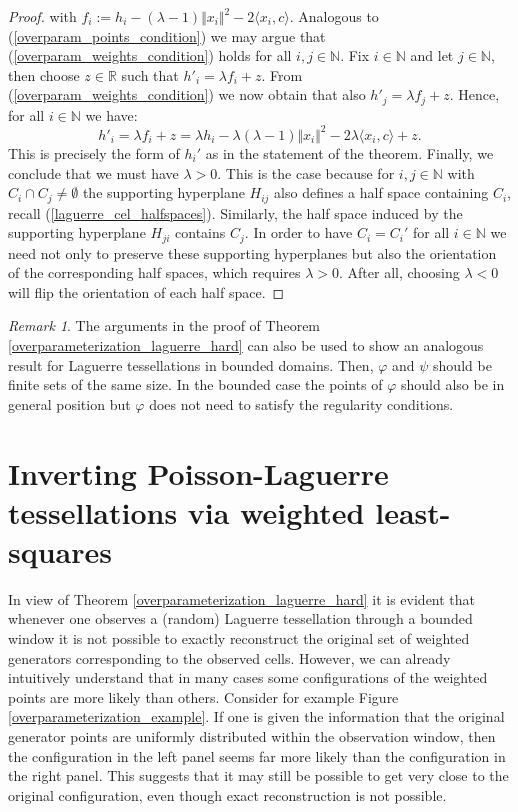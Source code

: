 \documentclass{article}
\newcommand{\NN}{\mathbb{N}}
\newcommand{\RR}{\mathbb{R}}
\theoremstyle{plain}
\theoremstyle{remark}
\newtheorem{remark}{Remark}
\theoremstyle{definition}
\begin{document}
\begin{proof}
    with $f_i := h_i - (\lambda - 1)\Vert x_i \Vert^2 - 2\langle x_i,c\rangle$. Analogous to (\ref{overparam_points_condition}) we may argue that (\ref{overparam_weights_condition}) holds for all $i,j \in \NN$. Fix $i \in \NN$ and let $j \in \NN$, then choose $z \in \RR$ such that $h'_i = \lambda f_i + z$. From (\ref{overparam_weights_condition}) we now obtain that also $h'_j = \lambda f_j + z$. Hence, for all $i \in \NN$ we have:  
    \[h'_i = \lambda f_i + z = \lambda h_i - \lambda(\lambda - 1)\Vert x_i \Vert^2 - 2\lambda\langle x_i,c\rangle + z.\]
    This is precisely the form of $h_i'$ as in the statement of the theorem. Finally, we conclude that we must have $\lambda > 0$. This is the case because for $i,j \in \NN$ with $C_i \cap C_j \neq \emptyset$ the supporting hyperplane $H_{ij}$ also defines a half space containing $C_i$, recall (\ref{laguerre_cel_halfspaces}). Similarly, the half space induced by the supporting hyperplane $H_{ji}$ contains $C_j$. In order to have $C_i = C_i'$ for all $i \in \NN$ we need not only to preserve these supporting hyperplanes but also the orientation of the corresponding half spaces, which requires $\lambda > 0$. After all, choosing $\lambda < 0$ will flip the orientation of each half space.
\end{proof}

\begin{remark}
    The arguments in the proof of Theorem \ref{overparameterization_laguerre_hard} can also be used to show an analogous result for Laguerre tessellations in bounded domains. Then, $\varphi$ and $\psi$ should be finite sets of the same size. In the bounded case the points of $\varphi$ should also be in general position but $\varphi$ does not need to satisfy the regularity conditions.
\end{remark}

\section{Inverting Poisson-Laguerre tessellations via weighted least-squares}\label{section_wls_reconstruction}
In view of Theorem \ref{overparameterization_laguerre_hard} it is evident that whenever one observes a (random) Laguerre tessellation through a bounded window it is not possible to exactly reconstruct the original set of weighted generators corresponding to the observed cells. However, we can already intuitively understand that in many cases some configurations of the weighted points are more likely than others. Consider for example Figure \ref{overparameterization_example}. If one is given the information that the original generator points are uniformly distributed within the observation window, then the configuration in the left panel seems far more likely than the configuration in the right panel. This suggests that it may still be possible to get very close to the original configuration, even though exact reconstruction is not possible.
\end{document}
